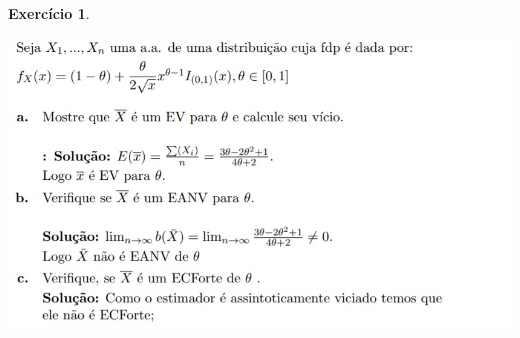 \documentclass[letter,11pt]{article}
\newtheorem{exer}{Exercício}
\begin{document}
\begin{exer} \rm
\end{exer}
\includegraphics[scale=0.7]{gabarito_ex8_lista7.jpg}
\end{document}
